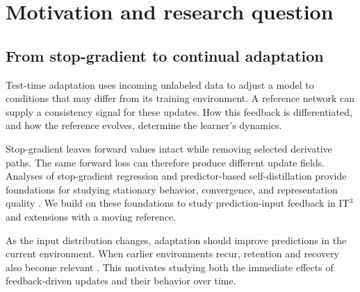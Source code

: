 \documentclass[11pt,a4paper]{article}
\begin{document}
\newpage
{}
\begin{abstract}
Test-time adaptation allows a pretrained model to learn from incoming data without additional labels. In idempotent test-time training (IT$^3$), the model's prediction becomes an input to a reference network, creating a feedback loop. The resulting learning dynamics depend on which gradients pass through the reference and whether its parameters remain fixed or follow the adapting model.

This research will analyze how these choices affect stability and prediction accuracy. We will characterize the update fields induced by different gradient paths, study the coupled dynamics of the model and reference, and investigate their behavior under changing input distributions. Mathematical analysis, including local stability and Lyapunov methods, will guide controlled experiments on trained models. The goal is to identify conditions that support stable, useful adaptation and explain when consistency-driven updates improve predictions.
\end{abstract}

\section{Motivation and research question}

\subsection{From stop-gradient to continual adaptation}
Test-time adaptation uses incoming unlabeled data to adjust a model to conditions that may differ from its training environment. A reference network can supply a consistency signal for these updates. How this feedback is differentiated, and how the reference evolves, determine the learner's dynamics.

Stop-gradient leaves forward values intact while removing selected derivative paths. The same forward loss can therefore produce different update fields. Analyses of stop-gradient regression and predictor-based self-distillation provide foundations for studying stationary behavior, convergence, and representation quality \cite{shen2026,peira2026}. We build on these foundations to study prediction-input feedback in IT$^3$ and extensions with a moving reference.

As the input distribution changes, adaptation should improve predictions in the current environment. When earlier environments recur, retention and recovery also become relevant \cite{oclreview2025,clposition2026}. This motivates studying both the immediate effects of feedback-driven updates and their behavior over time.
\end{document}
